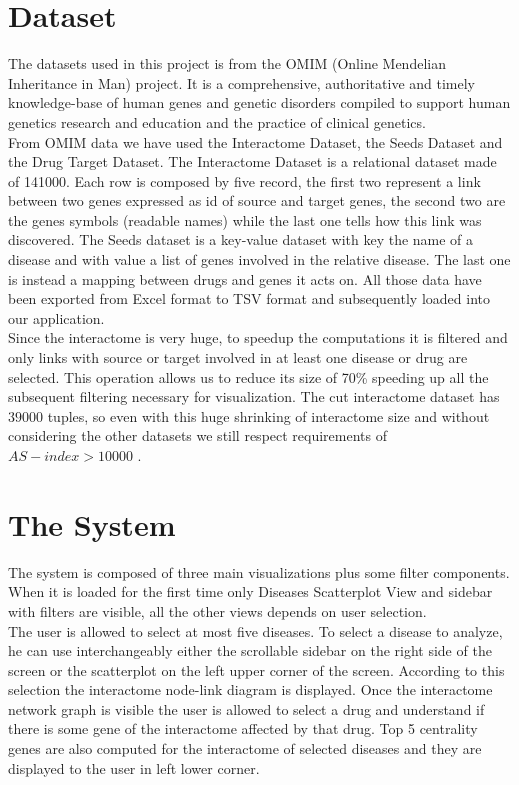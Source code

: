 \documentclass[12pt,twocolumn,twoside]{article}
\begin{document}
\section*{Dataset} %
The datasets used in this project is from the OMIM (Online Mendelian Inheritance in Man) project. It is a comprehensive, authoritative and timely knowledge-base of human genes and genetic disorders compiled to support human genetics research and education and the practice of clinical genetics. \\
From OMIM data we have used the Interactome Dataset, the Seeds Dataset and the Drug Target Dataset. The Interactome Dataset is a relational dataset made of 141000. Each row is composed by five record, the first two represent a link between two genes expressed as id of source and target genes, the second two are the genes symbols (readable names) while the last one tells how this link was discovered. The Seeds dataset is a key-value dataset with key the name of a disease and with value a list of genes involved in the relative disease. The last one is instead a mapping between drugs and genes it acts on. All those data have been exported from Excel format to TSV format and subsequently loaded into our application.\\ Since the interactome is very huge, to speedup the computations it is filtered and only links with source or target involved in at least one disease or drug are selected. This operation allows us to reduce its size of 70\% speeding up all the subsequent filtering necessary for visualization. The cut interactome dataset has $39000$ tuples, so even with this huge shrinking of interactome size and without considering the other datasets  we still respect requirements of $AS-index > 10000$ .

\section*{The System}
The system is composed of three main visualizations plus some filter components. When it is loaded for the first time only Diseases Scatterplot View and sidebar with filters are visible, all the other views depends on user selection.\\ 
The user is allowed to select at most five diseases. To select a disease to analyze, he can use interchangeably either the scrollable sidebar on the right side of the screen or the scatterplot on the left upper corner of the screen. According to this selection the interactome node-link diagram is displayed. Once the interactome network graph is visible the user is allowed to select a drug and understand if there is some gene of the interactome affected by that drug. Top 5 centrality genes are also computed for the interactome of selected diseases and they are displayed to the user in left lower corner.
\end{document}
